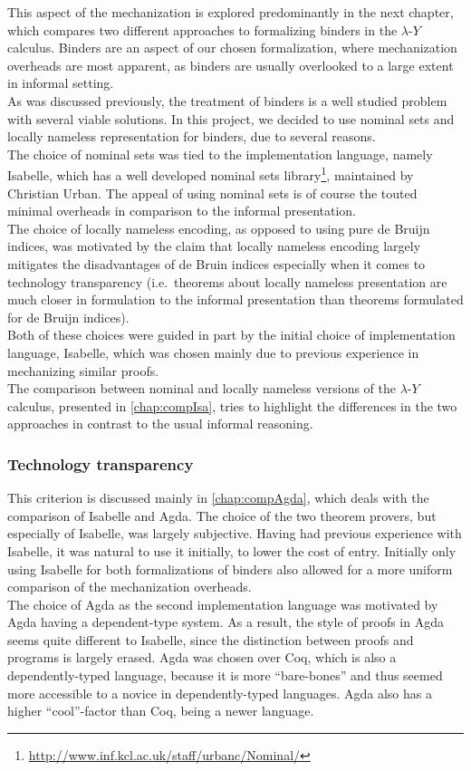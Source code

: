 \documentclass[a4paper, 12pt, twoside]{style/ociamthesis}
\theoremstyle{plain}
\theoremstyle{definition}
\theoremstyle{remark}
\renewcommand{\href}[2]{#2\footnote{\url{#1}}}
\newcommand{\lamy}{\lambda\text{-}Y}
\begin{document}
This aspect of the mechanization is explored predominantly in the next
chapter, which compares two different approaches to formalizing binders
in the \(\lamy\) calculus. Binders are an aspect of our chosen
formalization, where mechanization overheads are most apparent, as
binders are usually overlooked to a large extent in informal setting.\\
As was discussed previously, the treatment of binders is a well studied
problem with several viable solutions. In this project, we decided to
use nominal sets and locally nameless representation for binders, due to
several reasons.\\
The choice of nominal sets was tied to the implementation language,
namely Isabelle, which has a well developed
\href{http://www.inf.kcl.ac.uk/staff/urbanc/Nominal/}{nominal sets
library}, maintained by Christian Urban. The appeal of using nominal
sets is of course the touted minimal overheads in comparison to the
informal presentation.\\
The choice of locally nameless encoding, as opposed to using pure de
Bruijn indices, was motivated by the claim that locally nameless
encoding largely mitigates the disadvantages of de Bruin indices
especially when it comes to technology transparency (i.e.~theorems about
locally nameless presentation are much closer in formulation to the
informal presentation than theorems formulated for de Bruijn indices).\\
Both of these choices were guided in part by the initial choice of
implementation language, Isabelle, which was chosen mainly due to
previous experience in mechanizing similar proofs.\\
The comparison between nominal and locally nameless versions of the
\(\lamy\) calculus, presented in \cref{chap:compIsa}, tries to highlight
the differences in the two approaches in contrast to the usual informal
reasoning.

\subsubsection{Technology transparency}\label{technology-transparency}

This criterion is discussed mainly in \cref{chap:compAgda}, which deals
with the comparison of Isabelle and Agda. The choice of the two theorem
provers, but especially of Isabelle, was largely subjective. Having had
previous experience with Isabelle, it was natural to use it initially,
to lower the cost of entry. Initially only using Isabelle for both
formalizations of binders also allowed for a more uniform comparison of
the mechanization overheads.\\
The choice of Agda as the second implementation language was motivated
by Agda having a dependent-type system. As a result, the style of proofs
in Agda seems quite different to Isabelle, since the distinction between
proofs and programs is largely erased. Agda was chosen over Coq, which
is also a dependently-typed language, because it is more ``bare-bones''
and thus seemed more accessible to a novice in dependently-typed
languages. Agda also has a higher ``cool''-factor than Coq, being a
newer language.
\end{document}

